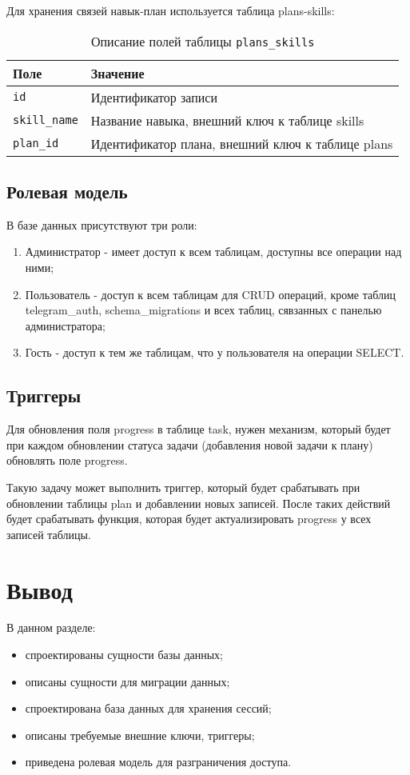 Для хранения связей навык-план используется таблица plans-skills:
\begin{table}[!ht]
    \caption{Описание полей таблицы \texttt{plans\_skills}}
    \label{tbl:plans-skills}
    \begin{center}
        \begin{tabular}{|p{}p{}|}
            \hline
            \textbf{Поле} & \textbf{Значение} \\\hline
            \texttt{id} & Идентификатор записи \\\hline
            \texttt{skill\_name} & Название навыка, внешний ключ к таблице skills \\\hline
            \texttt{plan\_id} & Идентификатор плана, внешний ключ к таблице plans \\\hline
        \end{tabular}
    \end{center}
\end{table}


\subsection{Ролевая модель}
В базе данных присутствуют три роли:
\begin{enumerate}
\item Администратор - имеет доступ к всем таблицам, доступны все операции над ними;
\item Пользователь - доступ к всем таблицам для CRUD операций, кроме таблиц telegram\_auth, schema\_migrations и всех таблиц, сявзанных с панелью администратора;
\item Гость - доступ к тем же таблицам, что у пользователя на операции SELECT.
\end{enumerate}

\subsection{Триггеры}
Для обновления поля progress в таблице task, нужен механизм, который будет при каждом обновлении статуса задачи (добавления новой задачи к плану) обновлять поле progress.

Такую задачу может выполнить триггер, который будет срабатывать при обновлении таблицы plan и добавлении новых записей. После таких действий будет срабатывать функция, которая будет актуализировать progress у всех записей таблицы.  

\section{Вывод}
В данном разделе:
\begin{itemize}
\item спроектированы сущности базы данных;
\item описаны сущности для миграции данных;
\item спроектирована база данных для хранения сессий;
\item описаны требуемые внешние ключи, триггеры;
\item приведена ролевая модель для разграничения доступа.
\end{itemize}